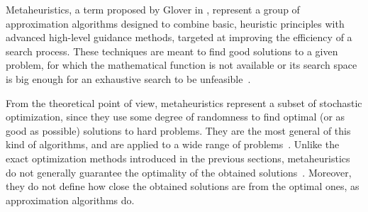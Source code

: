 Metaheuristics, a term proposed by Glover in \cite{Glover-Future_paths_for_integer_programming_and_links_to_artificial_intelligence:1986},
represent a group of approximation algorithms designed to combine
basic, heuristic principles with advanced high-level guidance methods,
targeted at improving the efficiency of a search process. These techniques
are meant to find good solutions to a given problem, for which the
mathematical function is not available or its search space is big
enough for an exhaustive search to be unfeasible~\cite{Kochenberger_Handbook_of_metaheuristics:2003}.

From the theoretical point of view, metaheuristics represent a subset
of stochastic optimization, since they use some degree of randomness
to find optimal (or as good as possible) solutions to hard problems.
They are the most general of this kind of algorithms, and are applied
to a wide range of problems~\cite{Luke-Essentials_of_metaheuristics:2009}.
Unlike the exact optimization methods introduced in the previous sections,
metaheuristics do not generally guarantee the optimality of the obtained
solutions~\cite{Talbi_Metaheuristics:2009}. Moreover, they do not
define how close the obtained solutions are from the optimal ones,
as approximation algorithms do.

